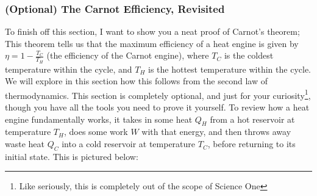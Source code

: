 
\subsubsection{(Optional) The Carnot Efficiency, Revisited}
To finish off this section, I want to show you a neat proof of Carnot's theorem; This theorem tells us that the maximum efficiency of a heat engine is given by $\eta = 1- \frac{T_C}{T_H}$ (the efficiency of the Carnot engine), where $T_C$ is the coldest temperature within the cycle, and $T_H$ is the hottest temperature within the cycle. We will explore in this section how this follows from the second law of thermodynamics. This section is completely optional, and just for your curiosity\footnote{Like seriously, this is completely out of the scope of Science One}, though you have all the tools you need to prove it yourself. To review how a heat engine fundamentally works, it takes in some heat $Q_H$ from a hot reservoir at temperature $T_H$, does some work $W$ with that energy, and then throws away waste heat $Q_C$ into a cold reservoir at temperature $T_C$, before returning to its initial state. This is pictured below:
\begin{center}
\end{center}


